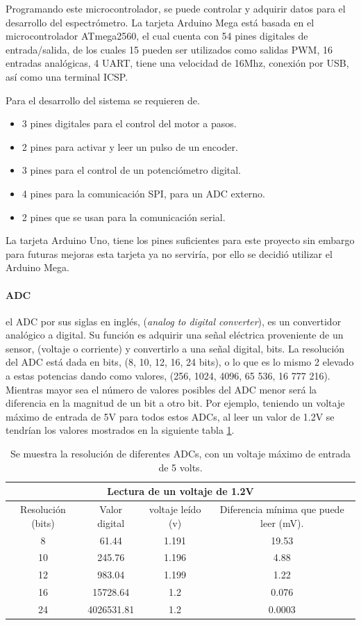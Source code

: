 Programando este microcontrolador, se puede controlar y adquirir datos para el desarrollo del espectrómetro. La tarjeta Arduino Mega está basada en el microcontrolador ATmega2560, el cual cuenta con 54 pines digitales de entrada/salida, de los cuales 15 pueden ser utilizados como salidas PWM, 16 entradas analógicas, 4 UART, tiene una velocidad de 16Mhz, conexión por USB, así como una terminal ICSP. 


Para el desarrollo del sistema se requieren de.
\begin{itemize}
	\item 3 pines digitales para el control del motor a pasos.
	\item 2 pines para activar y leer un pulso de un encoder.
	\item 3 pines para el control de un potenciómetro digital.
	\item 4 pines para la comunicación SPI, para un ADC externo.
	\item 2 pines que se usan para la comunicación serial.
\end{itemize}
La tarjeta Arduino Uno, tiene los pines suficientes para este proyecto sin embargo para futuras mejoras esta tarjeta ya no serviría, por ello se decidió utilizar el Arduino Mega.

\paragraph{ADC} el ADC por sus siglas en inglés, (\textit{analog to digital converter}), es un convertidor analógico a digital. Su función es adquirir una señal eléctrica proveniente de un sensor, (voltaje o corriente) y convertirlo a una señal digital, bits. 
La resolución del ADC está dada en bits, (8, 10, 12, 16, 24 bits), o lo que es lo mismo 2 elevado a estas potencias dando como valores, (256, 1024, 4096, 65 536, 16 777 216). Mientras mayor sea el número de valores posibles del ADC menor será la diferencia en la magnitud de un bit a otro bit. Por ejemplo, teniendo un voltaje máximo de entrada de 5V para todos estos ADCs, al leer un valor de 1.2V se tendrían los valores mostrados en la siguiente tabla \ref{tabla:adcRe}.

\begin{table}[h]
\centering
\caption{Se muestra la resolución de diferentes ADCs, con un voltaje máximo de entrada de 5 volts.}
\label{tabla:adcRe}
\begin{tabular}{|c|c|c|c|}
	\hline 
	\multicolumn{4}{|c|}{Lectura de un voltaje de 1.2V} \\ 
	\hline 
	Resolución (bits) & Valor digital & voltaje leído (v) & Diferencia mínima que puede leer (mV).\\ 
	\hline 
	8  & 61.44 & 1.191 & 19.53 \\ 
	\hline 
	10 & 245.76  & 1.196 & 4.88\\ 
	\hline 
	12	& 983.04 & 1.199 & 1.22 \\ 
	\hline 
	16	& 15728.64 & 1.2 & 0.076 \\ 
	\hline 
	24	& 4026531.81 & 1.2 & 0.0003 \\ 
	\hline 
\end{tabular} 

\end{table}
